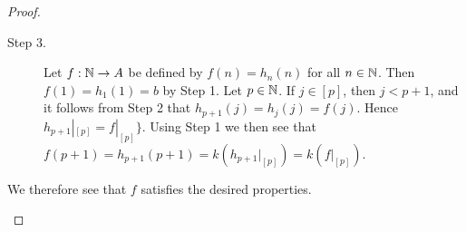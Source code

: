 \documentclass[a4paper,english,12pt]{article}
\begin{document}
\begin{proof}
\begin{description}
\begin{description}
	\item[Step 3.] Let $f: \mathbb{N} \to A$ be defined by $f(n) = h_n(n)$ for all $n\in \mathbb{N}$. Then $f(1)=h_1(1)=b$ by Step 1. Let $p\in \mathbb{N}$. If $j\in [p]$, then $j < p + 1$, and it follows from Step 2 that $h_{p+1}(j)=h_j(j)=f(j)$. Hence $h_{p+1}|_{[p]}=f|_{[p]}\}$. Using Step 1 we then see that $f(p + 1) = h_{p+1}(p + 1) = k(h_{p+1}|_{[p]})=k(f|_{[p]})$. 
\end{description}	
We therefore see that $f$ satisfies the desired properties.
\end{description}
\end{proof}
\end{document}
